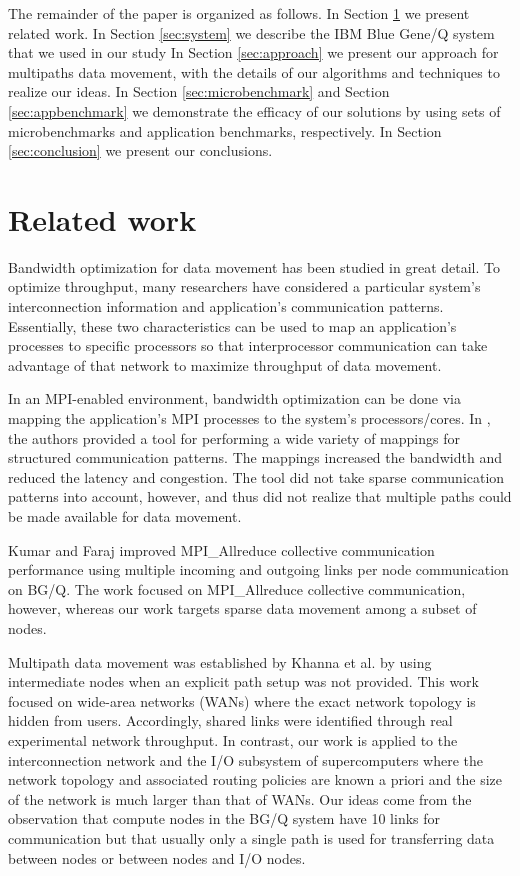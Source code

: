 \documentclass[final,5p,times]{elsarticle}
\begin{document}
The remainder of the paper is organized as follows. In Section \ref{sec:relatedwork} we present related work.
In Section \ref{sec:system}
we describe the IBM Blue Gene/Q system that we used in our study
In Section \ref{sec:approach}
we present our approach for multipaths data movement,
with the details of our algorithms and techniques to realize our ideas.
In Section \ref{sec:microbenchmark} and Section \ref{sec:appbenchmark} we demonstrate the efficacy of our solutions by using sets of microbenchmarks and application benchmarks, respectively.
In Section \ref{sec:conclusion}
we present our conclusions.

\section{Related work}
\label{sec:relatedwork}
Bandwidth optimization for data movement has been studied in great detail.
To optimize throughput,
many researchers have considered a particular system's interconnection information and application's communication patterns. Essentially, these two characteristics can be used to map an application's processes to specific processors so that interprocessor communication can take advantage of that network to maximize throughput of data movement.

In an MPI-enabled environment, bandwidth optimization can be done via mapping the application's MPI processes to the system's processors/cores. In \cite{Bhatele:mapping}, the authors provided a tool for performing a wide variety of mappings for structured communication patterns. The mappings increased the bandwidth and reduced the latency and congestion. The tool did not take sparse communication patterns into account, however, and thus did not realize that multiple paths could be made available for data movement.

Kumar and Faraj \cite{Kumar:Allreduce} improved MPI\_Allreduce collective communication performance using multiple incoming and outgoing links per node communication on BG/Q. The work focused on MPI\_Allreduce collective communication, however, whereas our work targets sparse data movement among a subset of nodes.

Multipath data movement was established by Khanna et al. \cite{Proxies:Gaurav} by using intermediate nodes when an explicit path setup was not provided. This work focused on wide-area networks (WANs) where the exact network topology is hidden from users. Accordingly, shared links were identified through real experimental network throughput. In contrast, our work is applied to the interconnection network and the I/O subsystem of supercomputers where the network topology and associated routing policies are known a priori and the size of the network is much larger than that of WANs. Our ideas come from the observation that compute nodes in the BG/Q system have 10 links for communication but that usually only a single path is used for transferring data between nodes or between nodes and I/O nodes.
\end{document}
